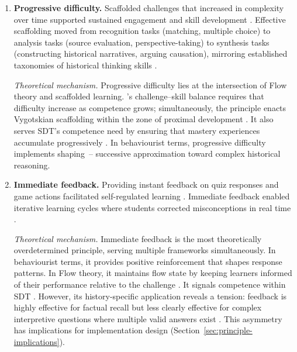 \begin{enumerate}
\textit{Theoretical mechanism.} Narrative integration serves SDT's autonomy need: quest structures provide meaningful choice within historically constrained parameters \cite{RyanDeci2000, vanRoyZaman2019}. Within \citeauthor{Landers2014}'s~\cite{Landers2014} moderation theory, narrative is the primary mechanism through which history education's dynamics-dominant profile (Section~\ref{sec:dmc-mapping}) achieves its effect~-- narrative moderates the relationship between instructional content and affective outcomes by providing emotional and cognitive engagement with historical situations \cite{Nicholson2015}. This makes narrative integration history's primary modulator in the Landers framework.

\item \textbf{Progressive difficulty.} Scaffolded challenges that increased in complexity over time supported sustained engagement and skill development \cite{19Chou2019, 9Lin2018, 64Hsu201324}. Effective scaffolding moved from recognition tasks (matching, multiple choice) to analysis tasks (source evaluation, perspective-taking) to synthesis tasks (constructing historical narratives, arguing causation), mirroring established taxonomies of historical thinking skills \cite{MonteSano2012, Reisman2012, Calandra2005323}.

\textit{Theoretical mechanism.} Progressive difficulty lies at the intersection of Flow theory and scaffolded learning. \citeauthor{Csikszentmihalyi1990}'s \cite{Csikszentmihalyi1990} challenge--skill balance requires that difficulty increase as competence grows; simultaneously, the principle enacts Vygotskian scaffolding within the zone of proximal development \cite{Keller2010}. It also serves SDT's competence need by ensuring that mastery experiences accumulate progressively \cite{RyanDeci2000, Sailer2017}. In behaviourist terms, progressive difficulty implements shaping~-- successive approximation toward complex historical reasoning.

\item \textbf{Immediate feedback.} Providing instant feedback on quiz responses and game actions facilitated self-regulated learning \cite{11Ternblad2023115, 15Slater2022, 24Ghannem2019}. Immediate feedback enabled iterative learning cycles where students corrected misconceptions in real time \cite{19Chou2019, 34Serrano2023}.

\textit{Theoretical mechanism.} Immediate feedback is the most theoretically overdetermined principle, serving multiple frameworks simultaneously. In behaviourist terms, it provides positive reinforcement that shapes response patterns. In Flow theory, it maintains flow state by keeping learners informed of their performance relative to the challenge \cite{Csikszentmihalyi1990}. It signals competence within SDT \cite{Sailer2017}. However, its history-specific application reveals a tension: feedback is highly effective for factual recall but less clearly effective for complex interpretive questions where multiple valid answers exist \cite{Clark2016}. This asymmetry has implications for implementation design (Section~\ref{sec:principle-implications}).


\end{enumerate}
